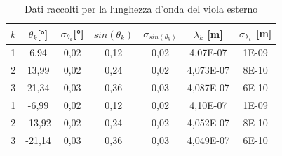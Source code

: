 \documentclass{article}
\begin{document}
        \begin{table}[H]

            \centering

            \begin{tabular}{c c c c c c c}

                \toprule 
                $k$ & $\theta_k$[°] & $\sigma_{\theta_k}$[°] & $sin(\theta_k)$ & $\sigma_{sin(\theta_k)}$ & $\lambda_k$ [m] & $\sigma_{\lambda_k}$ [m] \\
                
                \midrule
                1	&	6,94	&	0,02	&	0,12	&	0,02	&	4,07E-07	&	1E-09\\
                2	&	13,99	&	0,02	&	0,24	&	0,02	&	4,073E-07	&	8E-10  \\ 
                3	&	21,34	&	0,03	&	0,36	&	0,03	&	4,087E-07	&	6E-10\\
                1	&	-6,99	&	0,02	&	0,12	&	0,02	&	4,10E-07	&	1E-09\\
                2	&	-13,92	&	0,02	&	0,24	&	0,02	&	4,052E-07	&	8E-10\\
                3	&	-21,14	&	0,03	&	0,36	&	0,03	&	4,049E-07	&	6E-10\\
                \bottomrule
                
            \end{tabular}

            \caption{Dati raccolti per la lunghezza d'onda del viola esterno}
            
        \end{table}
        \label{table:viola est}
        
\end{document}
